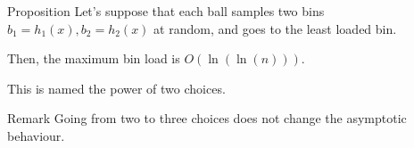 \documentclass[a4paper]{article}
\begin{document}
\begin{parag}{Proposition}
    Let's suppose that each ball samples two bins $b_1 = h_1\left(x\right), b_2 = h_2\left(x\right)$ at random, and goes to the least loaded bin.

    Then, the maximum bin load is $O\left(\ln\left(\ln\left(n\right)\right)\right)$.

    This is named the power of two choices.

    \begin{subparag}{Remark}
        Going from two to three choices does not change the asymptotic behaviour.
    \end{subparag}
\end{parag}
\end{document}
